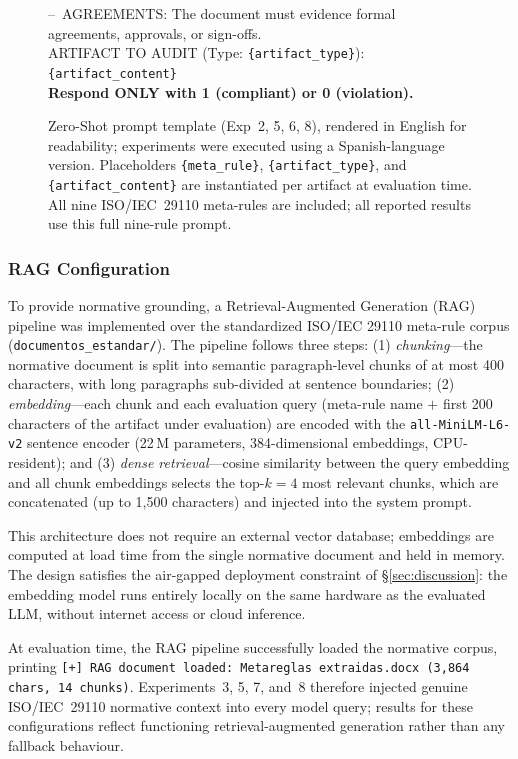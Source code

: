 \documentclass{ieeeaccess}
\begin{document}
\begin{figure}[htbp]
{{--~AGREEMENTS: The document must evidence formal agreements, approvals, or sign-offs.\\[4pt]
ARTIFACT TO AUDIT (Type: \texttt{\{artifact\_type\}}):\\
\texttt{\{artifact\_content\}}\\[4pt]
\textbf{Respond ONLY with 1 (compliant) or 0 (violation).}
}}
\caption{Zero-Shot prompt template (Exp~2, 5, 6, 8), rendered in English for readability; experiments were executed using a Spanish-language version. Placeholders \texttt{\{meta\_rule\}}, \texttt{\{artifact\_type\}}, and \texttt{\{artifact\_content\}} are instantiated per artifact at evaluation time. All nine ISO/IEC~29110 meta-rules are included; all reported results use this full nine-rule prompt.}
\label{fig:prompt_zeroshot}
\end{figure}

\subsubsection{RAG Configuration}

To provide normative grounding, a Retrieval-Augmented Generation (RAG) pipeline was implemented over the standardized ISO/IEC 29110 meta-rule corpus (\texttt{documentos\_estandar/}). The pipeline follows three steps: (1) \emph{chunking}---the normative document is split into semantic paragraph-level chunks of at most 400 characters, with long paragraphs sub-divided at sentence boundaries; (2) \emph{embedding}---each chunk and each evaluation query (meta-rule name $+$ first 200 characters of the artifact under evaluation) are encoded with the \texttt{all-MiniLM-L6-v2} sentence encoder (22\,M parameters, 384-dimensional embeddings, CPU-resident); and (3) \emph{dense retrieval}---cosine similarity between the query embedding and all chunk embeddings selects the top-$k=4$ most relevant chunks, which are concatenated (up to 1,500 characters) and injected into the system prompt.

This architecture does not require an external vector database; embeddings are computed at load time from the single normative document and held in memory. The design satisfies the air-gapped deployment constraint of §\ref{sec:discussion}: the embedding model runs entirely locally on the same hardware as the evaluated LLM, without internet access or cloud inference.

At evaluation time, the RAG pipeline successfully loaded the normative corpus, printing \texttt{[+] RAG document loaded: Metareglas extraidas.docx (3,864 chars, 14 chunks)}. Experiments~3, 5, 7, and~8 therefore injected genuine ISO/IEC~29110 normative context into every model query; results for these configurations reflect functioning retrieval-augmented generation rather than any fallback behaviour.
\end{document}
